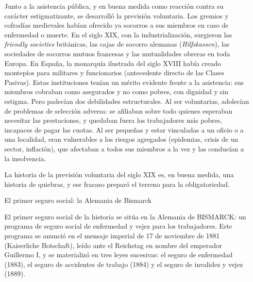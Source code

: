 \documentclass[10pt,a4paper]{article}
\begin{document}
Junto a la asistencia pública, y en buena medida como reacción contra su carácter estigmatizante, se desarrolló la previsión voluntaria. Los gremios y cofradías medievales habían ofrecido ya socorros a sus miembros en caso de enfermedad o muerte. En el siglo XIX, con la industrialización, surgieron las \textit{friendly societies} británicas, las cajas de socorro alemanas (\textit{Hilfskassen}), las sociedades de socorros mutuos francesas y las mutualidades obreras en toda Europa. En España, la monarquía ilustrada del siglo XVIII había creado montepíos para militares y funcionarios (antecedente directo de las Clases Pasivas). Estas instituciones tenían un mérito evidente frente a la asistencia: sus miembros cobraban como asegurados y no como pobres, con dignidad y sin estigma. Pero padecían dos debilidades estructurales. Al ser voluntarias, adolecían de problemas de selección adversa: se afiliaban sobre todo quienes esperaban necesitar las prestaciones, y quedaban fuera los trabajadores más pobres, incapaces de pagar las cuotas. Al ser pequeñas y estar vinculadas a un oficio o a una localidad, eran vulnerables a los riesgos agregados (epidemias, crisis de un sector, inflación), que afectaban a todos sus miembros a la vez y las conducían a la insolvencia. 

La historia de la previsión voluntaria del siglo XIX es, en buena medida, una historia de quiebras, y ese fracaso preparó el terreno para la obligatoriedad.

El primer seguro social: la Alemania de Bismarck

El primer seguro social de la historia se sitúa en la Alemania de BISMARCK: un programa de seguro social de enfermedad y vejez para los trabajadores. Este programa se anunció en el mensaje imperial de 17 de noviembre de 1881 (Kaiserliche Botschaft), leído ante el Reichstag en nombre del emperador Guillermo I, y se materializó en tres leyes sucesivas: el seguro de enfermedad (1883), el seguro de accidentes de trabajo (1884) y el seguro de invalidez y vejez (1889). 
\end{document}
